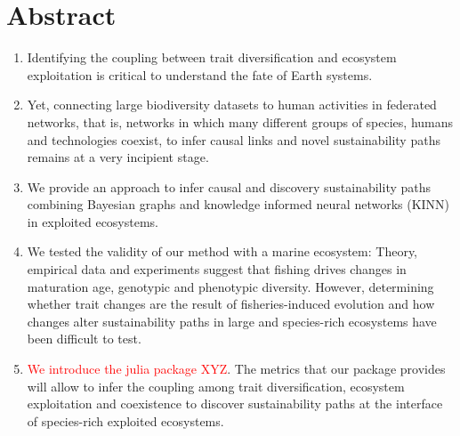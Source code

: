 \documentclass[12pt,a4paper]{article}
\begin{document}
\newpage
\section{Abstract}
\begin{enumerate}

\item Identifying the coupling between trait diversification and ecosystem exploitation is critical to understand the fate of Earth systems. 
\item Yet, connecting large biodiversity datasets to human activities in federated networks, that is, networks in which many different groups of species, humans and technologies coexist, to infer causal links and novel sustainability paths remains at a very incipient stage.  
\item We provide an approach to infer causal and discovery sustainability paths combining Bayesian graphs and knowledge informed neural networks (KINN) in exploited ecosystems.
\item We tested the validity of our method with a marine ecosystem: Theory, empirical data and experiments suggest that fishing drives changes in maturation age, genotypic and phenotypic diversity. However, determining whether trait changes are the result of fisheries-induced evolution and how changes alter sustainability paths in large and species-rich ecosystems have been difficult to test.
\item \textcolor{red}{We introduce the julia package XYZ}. The metrics that our package provides will allow to infer the coupling among trait diversification, ecosystem exploitation and coexistence to discover sustainability paths at the interface of species-rich exploited ecosystems.
\end{enumerate}
\end{document}
